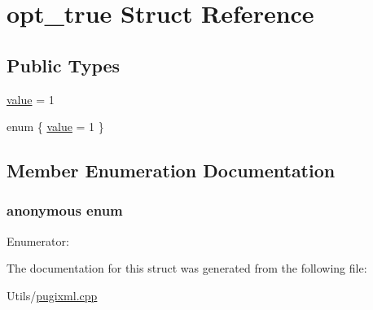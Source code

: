 \hypertarget{structopt__true}{
\section{opt\_\-true Struct Reference}
\label{structopt__true}
}
\subsection*{Public Types}
\begin{CompactItemize}
\item 
\hyperlink{structopt__true_6b3a9dd06e76271df50cfd55f92fffc23f8405655cc98a5710236f177e042b72}{value} = 1
\item 
enum \{ \hyperlink{structopt__true_6b3a9dd06e76271df50cfd55f92fffc23f8405655cc98a5710236f177e042b72}{value} =  1
 \}
\end{CompactItemize}


\subsection{Member Enumeration Documentation}
\hypertarget{structopt__true_6b3a9dd06e76271df50cfd55f92fffc2}{
\subsubsection["@3]{\setlength{\rightskip}{0pt plus 5cm}anonymous enum}}
\label{structopt__true_6b3a9dd06e76271df50cfd55f92fffc2}


\begin{Desc}
\item[Enumerator: ]\par
\begin{description}
\item[{\em 
\hypertarget{structopt__true_6b3a9dd06e76271df50cfd55f92fffc23f8405655cc98a5710236f177e042b72}{
value}
\label{structopt__true_6b3a9dd06e76271df50cfd55f92fffc23f8405655cc98a5710236f177e042b72}
}]\end{description}
\end{Desc}



The documentation for this struct was generated from the following file:\begin{CompactItemize}
\item 
Utils/\hyperlink{pugixml_8cpp}{pugixml.cpp}\end{CompactItemize}
